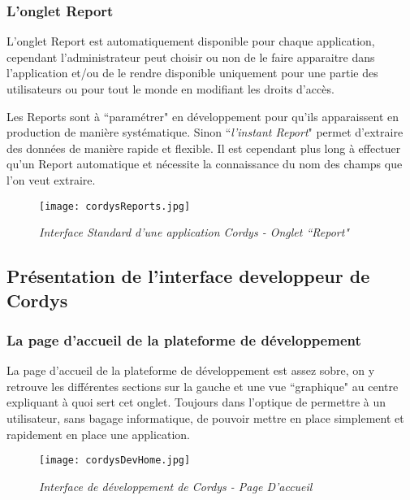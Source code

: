 \clearpage

\subsubsection{L'onglet Report}

L'onglet Report est automatiquement disponible pour chaque application, cependant l'administrateur peut choisir ou non de le faire apparaitre dans l'application et/ou de le rendre disponible uniquement pour une partie des utilisateurs ou pour tout le monde en modifiant les droits d'accès.

Les Reports sont à ``paramétrer" en développement pour qu'ils apparaissent en production de manière systématique. Sinon ``\emph{l'instant Report}" permet d'extraire des données de manière rapide et flexible. Il est cependant plus long à effectuer qu'un Report automatique et nécessite la connaissance du nom des champs que l'on veut extraire.

 \begin{figure}[H]
    \centering
    \texttt{[image: cordysReports.jpg]}
	\caption{\textit{Interface Standard d'une application Cordys - Onglet ``Report"}}\label{image.CordysReports} 
\end{figure}

\clearpage

\subsection{Présentation de l'interface developpeur de Cordys}

\subsubsection{La page d'accueil de la plateforme de développement}

La page d'accueil de la plateforme de développement est assez sobre, on y retrouve les différentes sections sur la gauche et une vue ``graphique" au centre expliquant à quoi sert cet onglet. Toujours dans l'optique de permettre à un utilisateur, sans bagage informatique, de pouvoir mettre en place simplement et rapidement en place une application.

 \begin{figure}[H]
    \centering
    \texttt{[image: cordysDevHome.jpg]}
	\caption{\textit{Interface de développement de Cordys - Page D'accueil}}\label{image.CordysDevHome} 
\end{figure}


